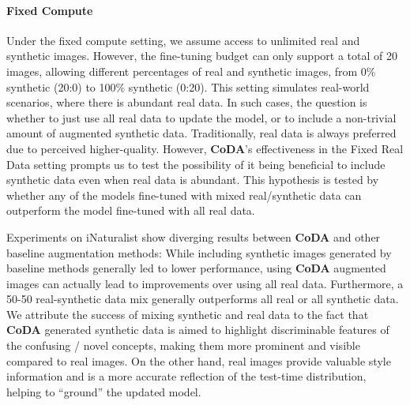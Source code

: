 \paragraph*{Fixed Compute} Under the fixed compute setting, we assume access to unlimited real and synthetic images. However, the fine-tuning budget can only support a total of 20 images, allowing different percentages of real and synthetic images, from 0\% synthetic (20:0) to 100\% synthetic (0:20). This setting simulates real-world scenarios, where there is abundant real data. In such cases, the question is whether to just use all real data to update the model, or to include a non-trivial amount of augmented synthetic data. Traditionally, real data is always preferred due to perceived higher-quality. However, \textbf{CoDA}'s effectiveness in the Fixed Real Data setting prompts us to test the possibility of it being beneficial to include synthetic data even when real data is abundant. This hypothesis is tested by whether any of the models fine-tuned with mixed real/synthetic data can outperform the model fine-tuned with all real data.

Experiments on iNaturalist show diverging results between \textbf{CoDA} and other baseline augmentation methods: While including synthetic images generated by baseline methods generally led to lower performance, using \textbf{CoDA} augmented images can actually lead to improvements over using all real data. Furthermore, a 50-50 real-synthetic data mix generally outperforms all real or all synthetic data. We attribute the success of mixing synthetic and real data to the fact that \textbf{CoDA} generated synthetic data is aimed to highlight discriminable features of the confusing / novel concepts, making them more prominent and visible compared to real images. On the other hand, real images provide valuable style information and is a more accurate reflection of the test-time distribution, helping to ``ground'' the updated model.









